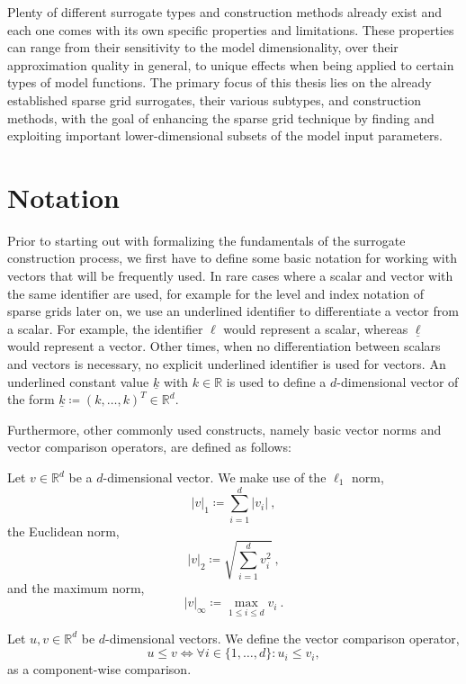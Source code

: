 \documentclass[
  a4paper,  %
  twoside,  %
  bibliography=totoc,
  headsepline,
  cleardoublepage=empty,
  parskip=half,
  draft=false
]{scrbook}
\begin{document}
Plenty of different surrogate types and construction methods already exist and each one comes with its own specific properties and limitations.
These properties can range from their sensitivity to the model dimensionality, over their approximation quality in general, to unique effects when being applied to certain types of model functions.
The primary focus of this thesis lies on the already established sparse grid surrogates, their various subtypes, and construction methods, with the goal of enhancing the sparse grid technique by finding and exploiting important lower-dimensional subsets of the model input parameters.

\newpage
\section{Notation}

Prior to starting out with formalizing the fundamentals of the surrogate construction process, we first have to define some basic notation for working with vectors that will be frequently used.
In rare cases where a scalar and vector with the same identifier are used, for example for the level and index notation of sparse grids later on, we use an underlined identifier to differentiate a vector from a scalar.
For example, the identifier $\ell$ would represent a scalar, whereas $\underline{\ell}$ would represent a vector.
Other times, when no differentiation between scalars and vectors is necessary, no explicit underlined identifier is used for vectors.
An underlined constant value $\underline{k}$ with $k \in \mathds{R}$ is used to define a $d$-dimensional vector of the form $\underline{k} \coloneqq (k, \dots, k)^T \in \mathds{R}^d$.

Furthermore, other commonly used constructs, namely basic vector norms and vector comparison operators, are defined as follows:
\begin{definition}
Let $v \in \mathds{R}^d$ be a $d$-dimensional vector.
We make use of the $\ell_1$ norm,
\begin{equation}
|v|_1 \coloneqq \sum_{i=1}^d |v_i| ~,
\end{equation}
the Euclidean norm,
\begin{equation}
|v|_2 \coloneqq \sqrt{\sum_{i=1}^d v_i^2} ~,
\end{equation}
and the maximum norm,
\begin{equation}
|v|_\infty \coloneqq \max_{1 \leq i \leq d} v_i ~.
\end{equation}
\end{definition}
%
\begin{definition}
Let $u, v \in \mathds{R}^d$ be $d$-dimensional vectors.
We define the vector comparison operator,
\begin{equation}
u \leq v \Leftrightarrow \forall i \in \{1,\dots,d\} \colon u_i \leq v_i,
\end{equation}
as a component-wise comparison.
\end{definition}
\end{document}
